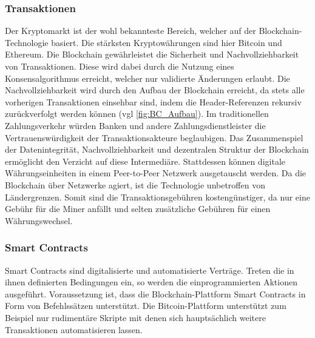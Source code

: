 \subsubsection{Transaktionen}
Der Kryptomarkt ist der wohl bekannteste Bereich, welcher auf der Blockchain-Technologie basiert.
Die stärksten Kryptowährungen sind hier Bitcoin und Ethereum. 
Die Blockchain gewährleistet die Sicherheit und Nachvollziehbarkeit von Transaktionen. 
\cite[p.~168]{chowdhary2025smart}
Diese wird dabei durch die Nutzung eines Konsensalgorithmus erreicht, welcher nur validierte 
Änderungen erlaubt. Die Nachvollziehbarkeit wird  durch den Aufbau der Blockchain erreicht, da stets 
alle vorherigen Transaktionen einsehbar sind, indem die Header-Referenzen rekursiv zurückverfolgt
werden können (vgl \autoref{fig:BC_Aufbau}).
Im traditionellen Zahlungsverkehr würden Banken und andere Zahlungsdienstleister die 
Vertrauenswürdigkeit der Transaktionsakteure beglaubigen.
Das Zusammenspiel der Datenintegrität, Nachvollziehbarkeit und dezentralen Struktur der
Blockchain ermöglicht den Verzicht auf diese Intermediäre. Stattdessen können digitale 
Währungseinheiten in einem Peer-to-Peer Netzwerk ausgetauscht werden.
\cite[p.~32]{fill2020blockchain}
Da die Blockchain über Netzwerke agiert, ist die Technologie unbetroffen von Ländergrenzen.
Somit sind die Transaktionsgebühren kostengünstiger, da nur eine Gebühr für 
die Miner anfällt und selten zusätzliche Gebühren für einen Währungswechsel.
\cite[p.~167]{chowdhary2025smart}


\subsubsection{Smart Contracts}
\label{sec:SmartContracts}
Smart Contracts sind digitalisierte und automatisierte Verträge.
\cite[p.~14]{pirafelnerblockchaintechnologie}
Treten die in ihnen definierten Bedingungen ein, so werden die einprogrammierten Aktionen
ausgeführt.
\cite[p.~55f]{fill2020blockchain}
Voraussetzung ist, dass die Blockchain-Plattform Smart Contracts in Form von 
Befehlssätzen unterstützt. Die Bitcoin-Plattform unterstützt zum Beispiel nur rudimentäre
Skripte mit denen sich hauptsächlich weitere Transaktionen automatisieren lassen. 

